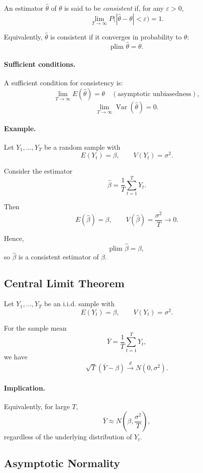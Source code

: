 An estimator $\hat{\theta}$ of $\theta$ is said to be \emph{consistent} if, for any $\varepsilon > 0$,
\[
\lim_{T \to \infty} P\big(|\hat{\theta} - \theta| < \varepsilon \big) = 1.
\]

Equivalently, $\hat{\theta}$ is consistent if it converges in probability to $\theta$:
\[
\text{plim } \hat{\theta} = \theta.
\]

\paragraph{Sufficient conditions.}
A sufficient condition for consistency is:
\[
\lim_{T \to \infty} E(\hat{\theta}) = \theta
\quad (\text{asymptotic unbiasedness}),
\]
\[
\lim_{T \to \infty} \operatorname{Var}(\hat{\theta}) = 0.
\]

\paragraph{Example.}
Let $Y_1,\dots,Y_T$ be a random sample with
\[
E(Y_t) = \beta,
\qquad
V(Y_t) = \sigma^2.
\]

Consider the estimator
\[
\hat{\beta}
=
\frac{1}{T}\sum_{t=1}^T Y_t.
\]

Then
\[
E(\hat{\beta}) = \beta,
\qquad
V(\hat{\beta}) = \frac{\sigma^2}{T} \to 0.
\]

Hence,
\[
\text{plim } \hat{\beta} = \beta,
\]
so $\hat{\beta}$ is a consistent estimator of $\beta$.
\subsection{Central Limit Theorem}

Let $Y_1,\dots,Y_T$ be an i.i.d. sample with
\[
E(Y_t)=\beta,
\qquad
V(Y_t)=\sigma^2.
\]

For the sample mean
\[
\bar{Y} = \frac{1}{T}\sum_{t=1}^T Y_t,
\]
we have
\[
\sqrt{T}(\bar{Y} - \beta)
\xrightarrow{d}
N(0,\sigma^2).
\]

\paragraph{Implication.}
Equivalently, for large $T$,
\[
\bar{Y} \approx N\!\left(\beta, \frac{\sigma^2}{T}\right),
\]
regardless of the underlying distribution of $Y_t$.

\subsection{Asymptotic Normality}

